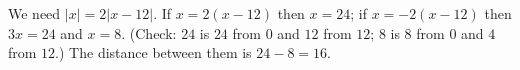 We need $|x|=2|x-12|$. If $x=2(x-12)$ then $x=24$; if $x=-2(x-12)$ then $3x=24$ and $x=8$. (Check: $24$ is $24$ from $0$ and $12$ from $12$; $8$ is $8$ from $0$ and $4$ from $12$.) The distance between them is $24-8=\boxed{16}$.
